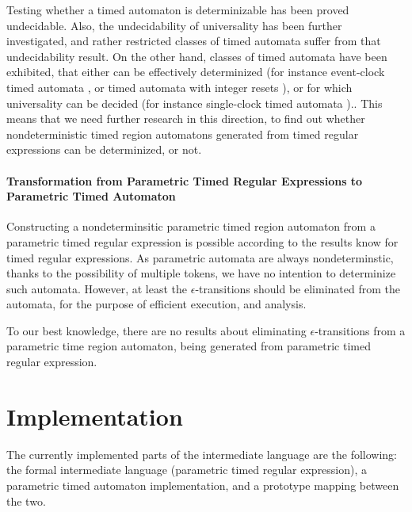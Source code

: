	Testing whether a timed automaton is determinizable has been proved undecidable\citep{finkel2006undecidable}.
	Also, the undecidability of universality has been further investigated, and rather restricted classes of timed automata suffer from that undecidability result. On the other hand, classes of timed automata have been exhibited, that either can be effectively determinized (for instance event-clock timed automata \citep{alur1994determinizable}, or timed automata
	with integer resets \citep{suman2008timed}), or for which universality can be decided (for instance
	single-clock timed automata \citep{ouaknine2004language}).\citep{baier2009timed}.
	This means that we need further research in this direction, to find out whether nondeterministic timed region automatons generated from timed regular expressions can be determinized, or not.

	\paragraph{Transformation from Parametric Timed Regular Expressions to Parametric Timed Automaton}
	Constructing a nondeterminsitic parametric timed region automaton from a parametric timed regular expression is possible according to the results know for timed regular expressions. As parametric automata are always nondeterminstic, thanks to the possibility of multiple tokens, we have no intention to determinize such automata.
	However, at least the $\epsilon$-transitions should be eliminated from the automata, for the purpose of efficient execution, and analysis.

	To our best knowledge, there are no results about eliminating $\epsilon$-transitions from a parametric time region automaton, being generated from parametric timed regular expression.



			
\section{Implementation}

	The currently implemented parts of the intermediate language are the following: the formal intermediate language (parametric timed regular expression), a parametric timed automaton 
	implementation, and a prototype mapping between the two.




